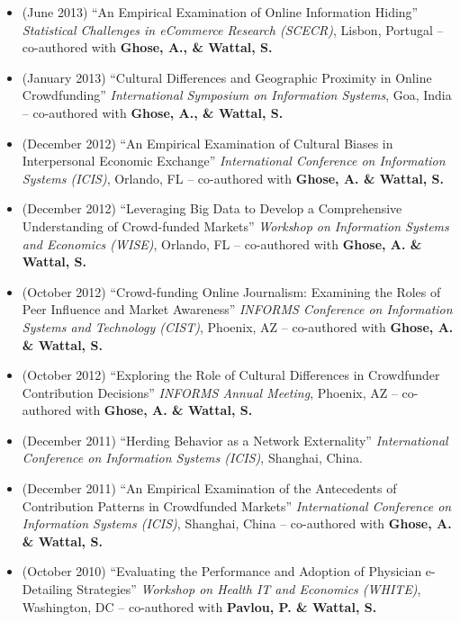 \documentclass[10.5pt,letterpaper,sans]{moderncv}        %
\begin{document}
\begin{itemize}
\item (June 2013) ``An Empirical Examination of Online Information Hiding'' \textit{Statistical Challenges in eCommerce Research (SCECR)}, Lisbon, Portugal -- co-authored with \textbf{Ghose, A., \& Wattal, S.}

\item (January 2013) ``Cultural Differences and Geographic Proximity in Online Crowdfunding'' \textit{International Symposium on Information Systems}, Goa, India -- co-authored with \textbf{Ghose, A., \& Wattal, S.}

\item (December 2012) ``An Empirical Examination of Cultural Biases in Interpersonal Economic Exchange'' \textit{International Conference on Information Systems (ICIS)}, Orlando, FL -- co-authored with \textbf{Ghose, A. \& Wattal, S.}

\item (December 2012) ``Leveraging Big Data to Develop a Comprehensive Understanding of Crowd-funded Markets'' \textit{Workshop on Information Systems and Economics (WISE)}, Orlando, FL -- co-authored with \textbf{Ghose, A. \& Wattal, S.}

\item (October 2012) ``Crowd-funding Online Journalism: Examining the Roles of Peer Influence and Market Awareness'' \textit{INFORMS Conference on Information Systems and Technology (CIST)}, Phoenix, AZ -- co-authored with \textbf{Ghose, A. \& Wattal, S.}

\item (October 2012) ``Exploring the Role of Cultural Differences in Crowdfunder Contribution Decisions'' \textit{INFORMS Annual Meeting}, Phoenix, AZ -- co-authored with \textbf{Ghose, A. \& Wattal, S.}

\item (December 2011) ``Herding Behavior as a Network Externality'' \textit{International Conference on Information Systems (ICIS)}, Shanghai, China.

\item (December 2011) ``An Empirical Examination of the Antecedents of Contribution Patterns in Crowdfunded Markets'' \textit{International Conference on Information Systems (ICIS)}, Shanghai, China -- co-authored with \textbf{Ghose, A. \& Wattal, S.}

\item (October 2010) ``Evaluating the Performance and Adoption of Physician e-Detailing Strategies'' \textit{Workshop on Health IT and Economics (WHITE)}, Washington, DC -- co-authored with \textbf{Pavlou, P. \& Wattal, S.}

\end{itemize}
\end{document}
